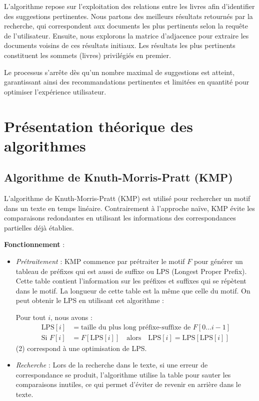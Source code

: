 \documentclass{article}
\begin{document}
    L’algorithme repose sur l’exploitation des relations entre les livres afin d’identifier des suggestions pertinentes. Nous partons des meilleurs résultats retournés par la recherche, qui correspondent aux documents les plus pertinents selon la requête de l’utilisateur. Ensuite, nous explorons la matrice d’adjacence pour extraire les documents voisins de ces résultats initiaux. Les résultats les plus pertinents constituent les sommets (livres) privilégiés en premier.
    
    Le processus s’arrête dès qu’un nombre maximal de suggestions est atteint, garantissant ainsi des recommandations pertinentes et limitées en quantité pour optimiser l’expérience utilisateur.

\section{Présentation théorique des algorithmes}
    \subsection{Algorithme de Knuth-Morris-Pratt (KMP)}
    L’algorithme de Knuth-Morris-Pratt (KMP) est utilisé pour rechercher un motif dans un texte en temps linéaire. Contrairement à l'approche naïve, KMP évite les comparaisons redondantes en utilisant les informations des correspondances partielles déjà établies.

    \textbf{Fonctionnement} :
    \begin{itemize}
        \item \textit{Prétraitement} : KMP commence par prétraiter le motif \( F \) pour générer un tableau de préfixes qui est aussi de suffixe ou LPS (Longest Proper Prefix). Cette table contient l’information sur les préfixes et suffixes qui se répètent dans le motif. La longueur de cette table est la même que celle du motif. On peut obtenir le LPS en utilisant cet algorithme : 
            
        Pour tout \( i \), nous avons :
            \begin{align}
                \text{LPS}[i] &= \text{taille du plus long préfixe-suffixe de } F[0 \dots i-1] \\
                \text{Si } F[i] &= F[\text{LPS}[i]] \quad \text{alors} \quad \text{LPS}[i] = \text{LPS}[\text{LPS}[i]]
            \end{align}
        (2) correspond à une optimisation de LPS.
        \item \textit{Recherche} : Lors de la recherche dans le texte, si une erreur de correspondance se produit, l’algorithme utilise la table pour sauter les comparaisons inutiles, ce qui permet d’éviter de revenir en arrière dans le texte.
    \end{itemize}
\end{document}
